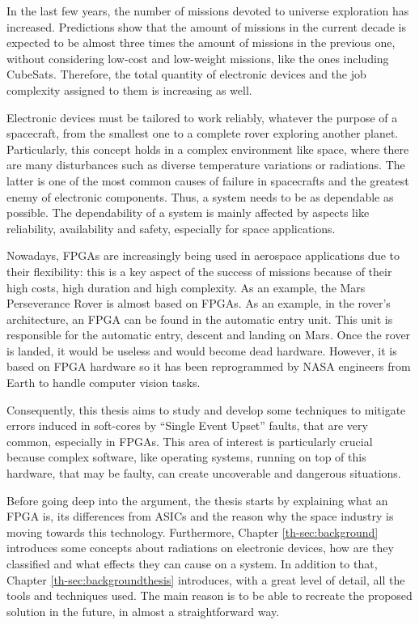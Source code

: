 In the last few years, the number of missions devoted to universe exploration has increased. Predictions show that the amount of missions in the current decade is expected to be almost three times the amount of missions in the previous one, without considering low-cost and low-weight missions, like the ones including CubeSats. Therefore, the total quantity of electronic devices and the job complexity assigned to them is increasing as well.\bigskip

Electronic devices must be tailored to work reliably, whatever the purpose of a spacecraft, from the smallest one to a complete rover exploring another planet. Particularly, this concept holds in a complex environment like space, where there are many disturbances such as diverse temperature variations or radiations. The latter is one of the most common causes of failure in spacecrafts and the greatest enemy of electronic components. Thus, a system needs to be as dependable as possible. The dependability of a system is mainly affected by aspects like reliability, availability and safety, especially for space applications.\bigskip

Nowadays, FPGAs are increasingly being used in aerospace applications due to their flexibility: this is a key aspect of the success of missions because of their high costs, high duration and high complexity. As an example, the Mars Perseverance Rover is almost based on FPGAs. As an example, in the rover's architecture, an FPGA can be found in the automatic entry unit. This unit is responsible for the automatic entry, descent and landing on Mars. Once the rover is landed, it would be useless and would become dead hardware. However, it is based on FPGA hardware so it has been reprogrammed by NASA engineers from Earth to handle computer vision tasks. \bigskip

Consequently, this thesis aims to study and develop some techniques to mitigate errors induced in soft-cores by “Single Event Upset” faults, that are very common, especially in FPGAs. This area of interest is particularly crucial because complex software, like operating systems, running on top of this hardware, that may be faulty, can create uncoverable and dangerous situations. \bigskip

Before going deep into the argument, the thesis starts by explaining what an FPGA is, its differences from ASICs and the reason why the space industry is moving towards this technology. Furthermore, Chapter \ref{th-sec:background} introduces some concepts about radiations on electronic devices, how are they classified and what effects they can cause on a system. In addition to that, Chapter \ref{th-sec:backgroundthesis} introduces, with a great level of detail, all the tools and techniques used. The main reason is to be able to recreate the proposed solution in the future, in almost a straightforward way. \bigskip

